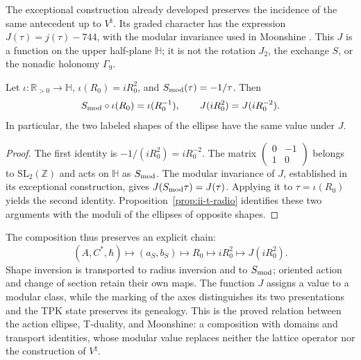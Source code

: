 The exceptional construction already developed preserves the incidence of the same
antecedent up to \(V^\natural\). Its graded character has the expression
\(J(\tau)=j(\tau)-744\), with the modular invariance used in
Moonshine \cite{flm,borcherds}. This \(J\) is a function on the
upper half-plane \(\mathbb H\); it is not the rotation \(J_2\), the
exchange \(S\), or the nonadic holonomy \(\Gamma_9\).

\begin{proposition}
\label{prop:ii-t-modular}
Let \(\iota:\mathbb R_{>0}\to\mathbb H\),
\(\iota(R_0)=iR_0^2\), and
\(S_{\rm mod}(\tau)=-1/\tau\). Then
\begin{equation}
 S_{\rm mod}\circ\iota(R_0)=\iota(R_0^{-1}),\qquad
 J(iR_0^2)=J(iR_0^{-2}).
 \label{eq:ii-t-modular}
\end{equation}
In particular, the two labeled shapes of the ellipse have the same
value under \(J\).
\end{proposition}

\begin{proof}
The first identity is
\(-1/(iR_0^2)=iR_0^{-2}\). The matrix
\(\left(\begin{smallmatrix}0&-1\\1&0\end{smallmatrix}\right)\)
belongs to \(\mathrm{SL}_2(\mathbb Z)\) and acts on
\(\mathbb H\) as \(S_{\rm mod}\). The modular invariance of
\(J\), established in its exceptional construction, gives
\(J(S_{\rm mod}\tau)=J(\tau)\). Applying it to
\(\tau=\iota(R_0)\) yields the second identity.
Proposition~\ref{prop:ii-t-radio} identifies these two arguments
with the moduli of the ellipses of opposite shapes.
\end{proof}

The composition thus preserves an explicit chain:
\[
 (A,C^*,\hbar)\longmapsto(a_S,b_S)
 \longmapsto R_0\longmapsto iR_0^2\longmapsto J(iR_0^2).
\]
Shape inversion is transported to radius inversion and to
\(S_{\rm mod}\); oriented action and change of section retain
their own maps. The function \(J\) assigns a value to a modular class, while
the marking of the axes distinguishes its two presentations and the TPK state
preserves its genealogy. This is the proved relation between the action
ellipse, T-duality, and Moonshine: a composition with domains and
transport identities, whose modular value replaces neither the lattice
operator nor the construction of \(V^\natural\).

